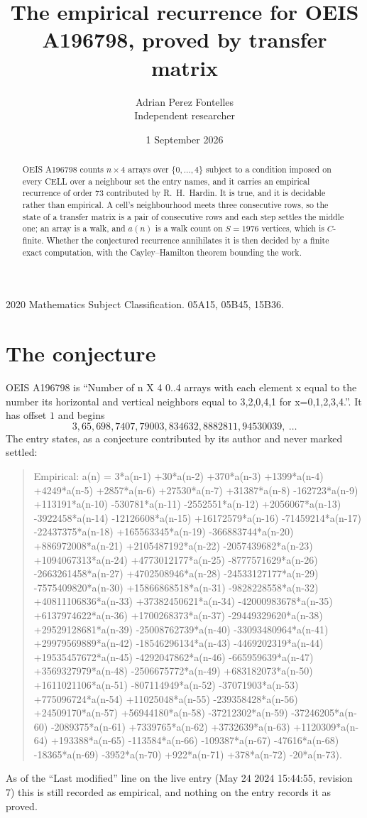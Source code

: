 \documentclass[11pt,a4paper]{article}
\title{The empirical recurrence for OEIS A196798, proved by transfer matrix}
\author{Adrian Perez Fontelles\\ \small Independent researcher}
\date{1 September 2026}
\theoremstyle{plain}
\theoremstyle{definition}
\begin{document}
\maketitle

\begin{abstract}
OEIS A196798 counts $n\times4$ arrays over $\{0,\dots,4\}$ subject to a condition imposed on
every CELL over a neighbour set the entry names, and it carries an empirical recurrence of
order $73$ contributed by R.~H.~Hardin. It is true, and it is decidable rather than
empirical. A cell's neighbourhood meets three consecutive rows, so the state of a transfer
matrix is a pair of consecutive rows and each step settles the middle one; an array is a
walk, and $a(n)$ is a walk count on $S=1976$ vertices, which is $C$-finite. Whether the
conjectured recurrence annihilates it is then decided by a finite exact computation, with the
Cayley--Hamilton theorem bounding the work.
\end{abstract}

\noindent\small 2020 Mathematics Subject Classification. 05A15, 05B45, 15B36.\normalsize

\section{The conjecture}

OEIS A196798 is ``Number of n X 4 0..4 arrays with each element x equal to the number its horizontal and vertical neighbors equal to 3,2,0,4,1 for x=0,1,2,3,4.''. It has offset $1$ and begins
\[
3, 65, 698, 7407, 79003, 834632, 8882811, 94530039,\ \dots
\]
The entry states, as a conjecture contributed by its author and never marked settled:
\begin{quote}
Empirical: a(n) = 3*a(n-1) +30*a(n-2) +370*a(n-3) +1399*a(n-4) +4249*a(n-5) +2857*a(n-6) +27530*a(n-7) +31387*a(n-8) -162723*a(n-9) +113191*a(n-10) -530781*a(n-11) -2552551*a(n-12) +2056067*a(n-13) -3922458*a(n-14) -12126608*a(n-15) +16172579*a(n-16) -71459214*a(n-17) -22437375*a(n-18) +165563345*a(n-19) -366883744*a(n-20) +886972008*a(n-21) +2105487192*a(n-22) -2057439682*a(n-23) +1094067313*a(n-24) +4773012177*a(n-25) -8777571629*a(n-26) -2663261458*a(n-27) +4702508946*a(n-28) -24533127177*a(n-29) -7575409820*a(n-30) +15866868518*a(n-31) -9828228558*a(n-32) +40811106836*a(n-33) +37382450621*a(n-34) -42000983678*a(n-35) +6137974622*a(n-36) +1700268373*a(n-37) -29449329620*a(n-38) +29529128681*a(n-39) -25008762739*a(n-40) -33093480964*a(n-41) +29979569889*a(n-42) -18546296134*a(n-43) -4469202319*a(n-44) +19535457672*a(n-45) -4292047862*a(n-46) -665959639*a(n-47) +3569327979*a(n-48) -2506675772*a(n-49) +683182073*a(n-50) +1611021106*a(n-51) -807114949*a(n-52) -37071903*a(n-53) +775096724*a(n-54) +11025048*a(n-55) -239358428*a(n-56) +24509170*a(n-57) +56944180*a(n-58) -37212302*a(n-59) -37246205*a(n-60) -2089375*a(n-61) +7339765*a(n-62) +3732639*a(n-63) +1120309*a(n-64) +193388*a(n-65) -113584*a(n-66) -109387*a(n-67) -47616*a(n-68) -18365*a(n-69) -3952*a(n-70) +922*a(n-71) +378*a(n-72) -20*a(n-73).
\end{quote}
As of the ``Last modified'' line on the live entry (May 24 2024 15:44:55, revision 7) this is still
recorded as empirical, and nothing on the entry records it as proved.
\end{document}
